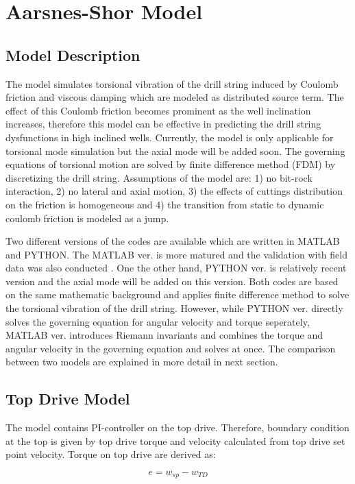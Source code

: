 \chapter{Aarsnes-Shor Model}
\label{ch:aarnessshormodel}

\section{Model Description}
The model simulates torsional vibration of the drill string induced by Coulomb friction and viscous damping which are modeled as distributed source term. The effect of this Coulomb friction becomes prominent as the well inclination increases, therefore this model can be effective in predicting the drill string dysfunctions in high inclined wells. Currently, the model is only applicable for torsional mode simulation but the axial mode will be added soon. The governing equations of torsional motion are solved by finite difference method (FDM) by discretizing the drill string. Assumptions of the model are: 1) no bit-rock interaction, 2) no lateral and axial motion, 3) the effects of cuttings distribution on the friction is homogeneous and 4) the transition from static to dynamic coulomb friction is modeled as a jump. 

Two different versions of the codes are available which are written in MATLAB and PYTHON. The MATLAB ver. is more matured and the validation with field data was also conducted \cite{ref:aarsnes2017a}. One the other hand, PYTHON ver. is relatively recent version and the axial mode will be added on this version. Both codes are based on the same mathematic background and applies finite difference method to solve the torsional vibration of the drill string. However, while PYTHON ver. directly solves the governing equation for angular velocity and torque seperately, MATLAB ver. introduces Riemann invariants and combines the torque and angular velocity in the governing equation and solves at once. The comparison between two models are explained in more detail in next section. 

\section{Top Drive Model}
The model contains PI-controller on the top drive. Therefore, boundary condition at the top is given by top drive torque and velocity calculated from top drive set point velocity. Torque on top drive are derived as:

\begin{equation}\label{AS_err}
  e = w_{sp} - w_{TD}
\end{equation}

